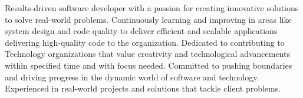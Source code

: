 
\vspace{6pt}
Results-driven software developer with a passion for creating innovative solutions to solve real-world problems. Continuously learning and improving in areas like system design and code quality to deliver efficient and scalable applications delivering high-quality code to the organization.
Dedicated to contributing to Technology organizations that value creativity and technological advancements within specified time and with focus needed. Committed to pushing boundaries and driving progress in the dynamic world of software and technology. Experienced in real-world projects and solutions that tackle client problems.